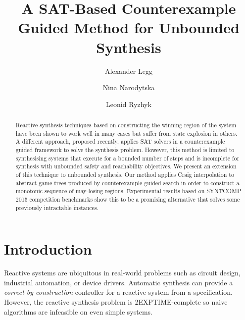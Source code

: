 \documentclass{llncs}
\begin{document}
\title{A SAT-Based Counterexample Guided Method for Unbounded Synthesis}

\author{Alexander Legg 
    \and Nina Narodytska
    \and Leonid Ryzhyk}


\maketitle

\begin{abstract}

    Reactive synthesis techniques based on constructing the winning region of
    the system have been shown to work well in many cases but suffer from state
    explosion in others.  A different approach, proposed recently, applies SAT
    solvers in a counterexample guided framework to solve the synthesis
    problem.  However, this method is limited to synthesising systems that
    execute for a bounded number of steps and is incomplete for synthesis with
    unbounded safety and reachability objectives.  We present an extension of
    this technique to unbounded synthesis.  Our method applies Craig
    interpolation to abstract game trees produced by counterexample-guided
    search in order to construct a monotonic sequence of may-losing regions.
    Experimental results based on SYNTCOMP 2015 competition benchmarks show
    this to be a promising alternative that solves some previously intractable
    instances.

\end{abstract}

\section{Introduction}

Reactive systems are ubiquitous in real-world problems such as circuit design,
industrial automation, or device drivers. Automatic synthesis can provide a
\emph{correct by construction} controller for a reactive system from a
specification.  However, the reactive synthesis problem is 2EXPTIME-complete so
naive algorithms are infeasible on even simple systems.
\end{document}
